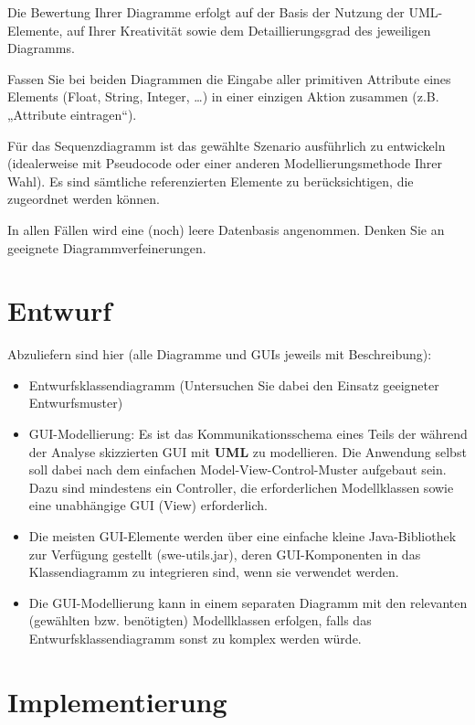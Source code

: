 Die Bewertung Ihrer Diagramme erfolgt auf der Basis der Nutzung der UML-Elemente, auf Ihrer Kreativität sowie dem Detaillierungsgrad des jeweiligen Diagramms. 

Fassen Sie bei beiden Diagrammen die Eingabe aller primitiven Attribute eines Elements (Float, String, Integer, …) in einer einzigen Aktion zusammen (z.B. „Attribute eintragen“). 

Für das Sequenzdiagramm ist das gewählte Szenario ausführlich zu entwickeln (idealerweise mit Pseudocode oder einer anderen Modellierungsmethode Ihrer Wahl). 
Es sind sämtliche referenzierten Elemente zu berücksichtigen, die zugeordnet werden können.  

In allen Fällen wird eine (noch) leere Datenbasis angenommen. Denken Sie an geeignete Diagrammverfeinerungen.  


\section{Entwurf}

Abzuliefern sind hier (alle Diagramme und GUIs jeweils mit Beschreibung): 

\begin{itemize}
    \item Entwurfsklassendiagramm (Untersuchen Sie dabei den Einsatz geeigneter Entwurfsmuster) 
    \item GUI-Modellierung: 
    Es ist das Kommunikationsschema eines Teils der während der Analyse skizzierten GUI mit \textbf{UML} zu modellieren. Die Anwendung selbst soll dabei nach dem einfachen Model-View-Control-Muster aufgebaut sein. Dazu sind mindestens ein Controller, die erforderlichen Modellklassen sowie eine unabhängige GUI (View) erforderlich.
    \item Die meisten GUI-Elemente werden über eine einfache kleine Java-Bibliothek zur Verfügung gestellt (swe-utils.jar), deren GUI-Komponenten in das Klassendiagramm zu integrieren sind, wenn sie verwendet werden.
    \item Die GUI-Modellierung kann in einem separaten Diagramm mit den relevanten (gewählten bzw. benötigten) Modellklassen erfolgen, falls das Entwurfsklassendiagramm sonst zu komplex werden würde.
\end{itemize}


\section{Implementierung}

